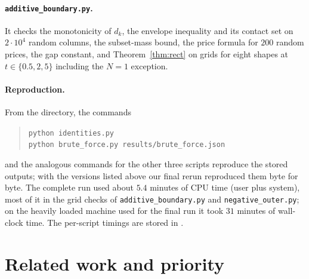 \documentclass[11pt]{article}
\theoremstyle{plain}
\theoremstyle{definition}
\theoremstyle{remark}
\begin{document}
\paragraph{\texttt{additive\_boundary.py}.}
It checks the monotonicity of $d_k$, the envelope inequality and its contact set on $2\cdot10^4$ random columns, the subset-mass bound, the price formula for $200$ random prices, the gap constant, and Theorem~\ref{thm:rect} on grids for eight shapes at $t\in\{0.5,2,5\}$ including the $N=1$ exception.

\paragraph{Reproduction.}
From the  directory, the commands
\begin{quote}\small
\texttt{python identities.py}\\
\texttt{python brute\_force.py results/brute\_force.json}
\end{quote}
and the analogous commands for the other three scripts reproduce the stored outputs; with the versions listed above our final rerun reproduced them byte for byte. The complete run used about $5.4$ minutes of CPU time (user plus system), most of it in the grid checks of \texttt{additive\_boundary.py} and \texttt{negative\_outer.py}; on the heavily loaded machine used for the final run it took $31$ minutes of wall-clock time. The per-script timings are stored in .

\section{Related work and priority}\label{sec:related}
\end{document}

